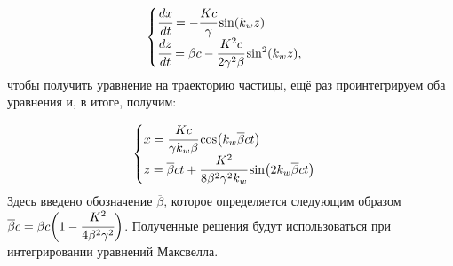 \begin{equation}
	\begin{cases}
	\label{eq:eq_of_motion_velocity}
		\cfrac{dx}{dt} = - \cfrac{Kc}{\gamma} \sin(k_w z)\\
		\cfrac{dz}{dt} = \beta c - \cfrac{K^2 c}{2 \gamma^2 \beta}\sin^2(k_w z),
	\end{cases} 
\end{equation}
чтобы получить уравнение на траекторию частицы, ещё раз проинтегрируем оба уравнения и, в итоге, получим:

\begin{equation}
	\begin{cases}
	\label{eq:eq_of_motion_trej}
		x = \cfrac{Kc}{\gamma k_w \beta} \cos(k_w\overline{\beta}ct)\\
		z = \overline{\beta}ct + \cfrac{K^2}{8 \beta^2 \gamma^2 k_w}\sin(2k_w\overline{\beta}ct) 
	\end{cases} 
\end{equation}
Здесь введено обозначение $\overline{\beta}$, которое определяется следующим образом $\overline{\beta}c = \beta c\bigg(1 - \cfrac{K^2}{4 \beta^2 \gamma^2}\bigg)$. Полученные решения будут использоваться при интегрировании уравнений Максвелла.
